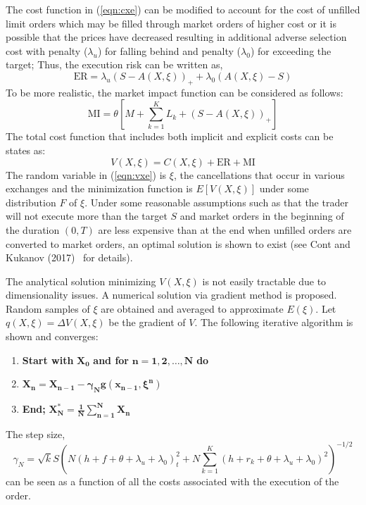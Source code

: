 The cost function in (\ref{eqn:cxe}) can be modified to account for the cost of unfilled limit orders which may be filled through market orders of higher cost or it is possible that the prices have decreased resulting in additional adverse selection cost with penalty ($\lambda_u$) for falling behind and penalty ($\lambda_0$) for exceeding the target; Thus, the execution risk can be written as,
	\begin{equation}\label{eqn:er}
	\text{ER}= \lambda_u (S-A(X,\xi))_+ + \lambda_0 (A(X,\xi)-S)
	\end{equation}
To be more realistic, the market impact function can be considered as follows:
	\begin{equation}\label{eqn:mi}
	\text{MI}= \theta \left[ M + \sum_{k=1}^K L_k + (S-A(X,\xi))_+ \right]
	\end{equation}
The total cost function that includes both implicit and explicit costs can be states as:
	\begin{equation}\label{eqn:vxe}
	V(X,\xi)= C(X,\xi) + \text{ER} + \text{MI}
	\end{equation}
The random variable in (\ref{eqn:vxe}) is $\xi$, the cancellations that occur in various exchanges and the minimization function is $E[V(X,\xi)]$ under some distribution $F$ of $\xi$. Under some reasonable assumptions such as that the trader will not execute more than the target $S$ and market orders in the beginning of the duration $(0,T)$ are less expensive than at the end when unfilled orders are converted to market orders, an optimal solution is shown to exist (see Cont and Kukanov (2017)~\cite{contk} for details).


The analytical solution minimizing $V(X,\xi)$ is not easily tractable due to dimensionality issues. A numerical solution via gradient method is proposed. Random samples of $\xi$ are obtained and averaged to approximate $E(\xi)$. Let $q(X,\xi)= \Delta V(X,\xi)$ be the gradient of $V$. The following iterative algorithm is shown and converges:
	\begin{enumerate}[--]
	\item \textbf{Start with }$\mathbf{X_0}$\textbf{ and for }$\mathbf{n=1,2,\ldots,N}$\textbf{ do}
	\item $\mathbf{X_n=X_{n-1} - \gamma_N g(x_{n-1}, \xi^n)}$
	\item \textbf{End; }$\mathbf{X_N^* = \frac{1}{N} \sum_{n=1}^N X_n}$
	\end{enumerate}
The step size, \small
	\begin{equation}\label{eqn:7gammaN}
	 \gamma_N = \sqrt{k} S \left( N(h+f+\theta+\lambda_u +\lambda_0)^2 _ t + N \sum_{k=1}^K (h+r_k+\theta+\lambda_u+\lambda_0)^2 \right)^{-1/2} 
	\end{equation}
\normalsize can be seen as a function of all the costs associated with the execution of the order.

